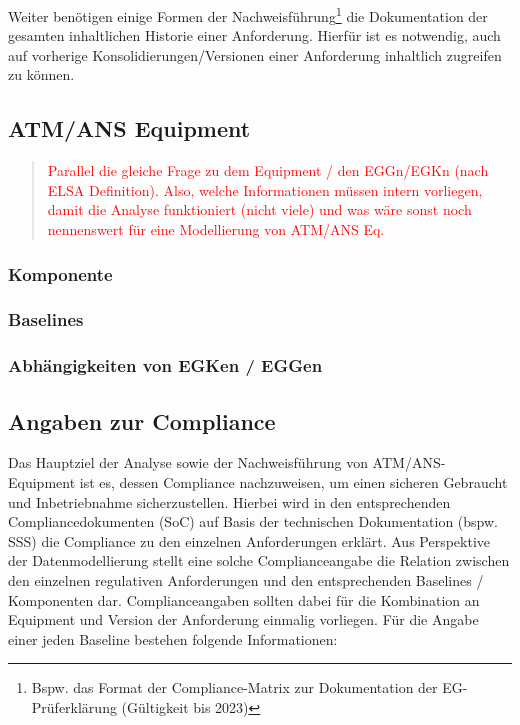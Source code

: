 Weiter benötigen einige Formen der Nachweisführung\footnote{Bspw. das Format der Compliance-Matrix zur Dokumentation der EG-Prüferklärung (Gültigkeit bis 2023)} die Dokumentation der gesamten inhaltlichen Historie einer Anforderung.
Hierfür ist es notwendig, auch auf vorherige Konsolidierungen/Versionen einer Anforderung inhaltlich zugreifen zu können. 
\pagebreak

\subsection{ATM/ANS Equipment}

\begin{quote}
\textcolor{red}{Parallel die gleiche Frage zu dem Equipment / den EGGn/EGKn (nach ELSA Definition). Also, welche Informationen müssen intern vorliegen, damit die Analyse funktioniert (nicht viele) und was wäre sonst noch nennenswert für eine Modellierung von ATM/ANS Eq.}
\end{quote}

\subsubsection{Komponente}
\subsubsection{Baselines}
\subsubsection{Abhängigkeiten von EGKen / EGGen}
\pagebreak

\subsection{Angaben zur Compliance} \label{model_angaben}

Das Hauptziel der Analyse sowie der Nachweisführung von ATM/ANS-Equipment ist es, dessen Compliance nachzuweisen, um einen sicheren Gebraucht und Inbetriebnahme sicherzustellen. 
Hierbei wird in den entsprechenden Compliancedokumenten (\ac{SoC}) auf Basis der technischen Dokumentation (bspw. \ac{SSS}) die Compliance zu den einzelnen Anforderungen erklärt.
Aus Perspektive der Datenmodellierung stellt eine solche Complianceangabe die Relation zwischen den einzelnen regulativen Anforderungen und den entsprechenden Baselines / Komponenten dar.
Complianceangaben sollten dabei für die Kombination an Equipment und Version der Anforderung einmalig vorliegen. 
Für die Angabe einer jeden Baseline bestehen folgende Informationen: 

